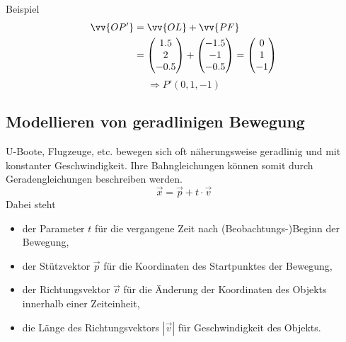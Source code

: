 \documentclass{article}
\begin{document}
\begin{boxx}[DarkBlue]{Beispiel}
\begin{align*}
            \vv{OP'} &= \vv{OL} + \vv{PF} \\
            &= \begin{pmatrix}1.5\\2\\-0.5\end{pmatrix} + \begin{pmatrix}-1.5\\-1\\-0.5\end{pmatrix} = \begin{pmatrix}0\\1\\-1\end{pmatrix}
        \end{align*}
        \[\Rightarrow P'(0,1,-1)\]
\end{boxx}
\subsection{Modellieren von geradlinigen Bewegung}
    U-Boote, Flugzeuge, etc. bewegen sich oft näherungsweise geradlinig und mit konstanter Geschwindigkeit.
    Ihre Bahngleichungen können somit durch Geradengleichungen beschreiben werden.
    \[\vec{x} = \vec{p} + t\cdot\vec{v}\]
    Dabei steht
    \begin{itemize}
        \item der Parameter $t$ für die vergangene Zeit nach (Beobachtungs-)Beginn der Bewegung,
        \item der Stützvektor $\vec{p}$ für die Koordinaten des Startpunktes der Bewegung,
        \item der Richtungsvektor $\vec{v}$ für die Änderung der Koordinaten des Objekts innerhalb einer Zeiteinheit,
        \item die Länge des Richtungsvektors $|\vec{v}|$ für Geschwindigkeit des Objekts.
    \end{itemize}
\end{document}
